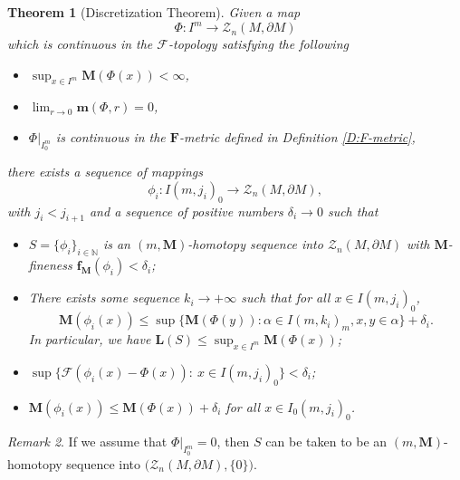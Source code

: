 \documentclass[10pt]{amsart}
\newtheorem{theorem}{Theorem}[section]
\theoremstyle{definition}
\theoremstyle{remark}
\newtheorem{remark}[theorem]{Remark}
\numberwithin{equation}{section}
\newcommand{\al}{\alpha}
\newcommand{\N}{\mathbb{N}}
\newcommand{\F}{\mathcal{F}}
\newcommand{\de}{\delta}
\newcommand{\Z}{\mathcal{Z}}
\newcommand{\m}{\mathbf{m}}
\newcommand{\M}{\mathbf{M}}
\newcommand{\bL}{\mathbf{L}}
\newcommand{\mf}{\mathbf{f}}
\newcommand{\mF}{\mathbf{F}}
\begin{document}
\begin{theorem}[Discretization Theorem]
\label{T:discretization}
Given a map 
\[ \Phi: I^m\rightarrow \Z_{n}(M, \partial M)\]
which is continuous in the $\F$-topology satisfying the following
\begin{itemize}
\item[$(a)$] $\sup_{x\in I^m}\M (\Phi(x))<\infty$,
\item[$(b)$] $\lim_{r\rightarrow 0}\m(\Phi, r)=0$,
\item[$(c)$] $\Phi|_{I^m_0}$ is continuous in the $\mF$-metric defined in Definition \ref{D:F-metric},
\end{itemize}
there exists a sequence of mappings
$$\phi_i: I(m, j_i)_0 \rightarrow \Z_n(M, \partial M),$$
with $j_i<j_{i+1}$ and a sequence of positive numbers $\de_i \to 0$  
such that 
\begin{itemize}
\item[(i)] $S=\{\phi_i\}_{i\in\N}$ is an $(m, \M)$-homotopy sequence into $\Z_{n}(M, \partial M)$ with $\M$-fineness $\mf_\M (\phi_i)<\de_i$;
\item[(ii)] There exists some sequence $k_i \to +\infty$ such that for all $x\in I(m, j_i)_0$,
\[ \M (\phi_i(x)) \leq \sup \{ \M (\Phi(y)) : \al\in I(m, k_i)_m, x, y \in\al\}+\de_i.\]
In particular, we have $\bL(S)\leq\sup_{x\in I^m}\M(\Phi(x))$;
\item[(iii)] $\sup\{\F(\phi_i(x)-\Phi(x)):\ x\in I(m, j_i)_{0}\}<\de_i$;
\item[(iv)] $\M(\phi_i(x))\leq \M(\Phi(x))+\de_i$ for all $x\in I_0(m, j_i)_0$.
\end{itemize}
\end{theorem}

\begin{remark}
If we assume that $\Phi|_{I^m_0}=0$, then $S$ can be taken to be an $(m, \M)$-homotopy sequence into $\big(\Z_{n}(M, \partial M), \{0\}\big)$.
\end{remark}
\end{document}

